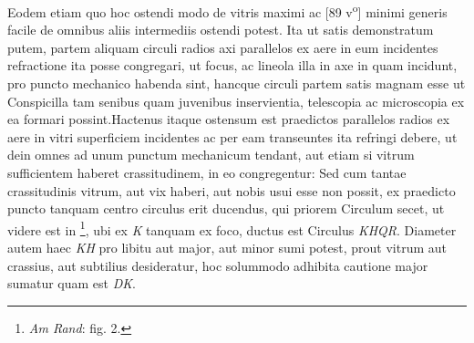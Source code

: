 \pstart Eodem etiam quo hoc ostendi modo de vitris maximi ac 
[89 v\textsuperscript{o}] minimi generis facile de omnibus aliis intermediis ostendi  potest. Ita ut satis demonstratum putem, partem aliquam  circuli radios axi parallelos ex aere in eum incidentes  refractione ita posse congregari, ut focus\protect{}, ac lineola illa in axe in quam incidunt, pro puncto mechanico\protect{} habenda sint,  hancque circuli partem satis magnam esse ut Conspicilla\protect{}  tam senibus quam juvenibus inservientia, telescopia\protect{} ac microscopia\protect{} ex ea formari possint.\pend \pstart  Hactenus itaque ostensum est praedictos parallelos radios ex  aere in vitri superficiem incidentes ac per eam transeuntes  ita refringi debere, ut dein omnes ad unum punctum mechanicum\protect{}  tendant, aut etiam si vitrum sufficientem haberet crassitudinem,  in eo congregentur: Sed cum tantae crassitudinis vitrum, aut  vix haberi, aut nobis usui esse non possit, ex praedicto puncto  tanquam centro circulus erit ducendus, qui priorem Circulum  secet, ut videre est in \footnote{\textit{Am Rand}: fig. 2.}, ubi ex \textit{K} tanquam  ex foco\protect{}, ductus est Circulus \textit{KHQR}. Diameter autem  haec \textit{KH} pro libitu aut major, aut minor sumi potest, prout  vitrum aut crassius, aut subtilius desideratur, hoc solummodo  adhibita cautione major sumatur quam est \textit{DK}.\pend 